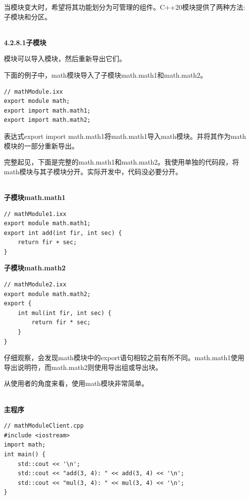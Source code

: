 
当模块变大时，希望将其功能划分为可管理的组件。C++20模块提供了两种方法:子模块和分区。

\hspace*{\fill} \\ %
\noindent
\textbf{4.2.8.1\hspace{0.2cm}子模块}

模块可以导入模块，然后重新导出它们。

下面的例子中，math模块导入了子模块math.math1和math.math2。

\begin{lstlisting}[style=styleCXX]
// mathModule.ixx
export module math;
export import math.math1;
export import math.math2;
\end{lstlisting}

表达式export import math.math1将math.math1导入math模块。并将其作为math模块的一部分重新导出。

完整起见，下面是完整的math.math1和math.math2。我使用单独的代码段，将math模块与其子模块分开。实际开发中，代码没必要分开。

\hspace*{\fill} \\ %
\noindent
\textbf{子模块math.math1}
\begin{lstlisting}[style=styleCXX]
// mathModule1.ixx
export module math.math1;
export int add(int fir, int sec) {
	return fir + sec;
}
\end{lstlisting}

\noindent
\textbf{子模块math.math2}
\begin{lstlisting}[style=styleCXX]
// mathModule2.ixx
export module math.math2;
export {
	int mul(int fir, int sec) {
		return fir * sec;
	}
}
\end{lstlisting}

仔细观察，会发现math模块中的export语句相较之前有所不同。math.math1使用导出说明符，而math.math2则使用导出组或导出块。

从使用者的角度来看，使用math模块非常简单。

\hspace*{\fill} \\ %
\noindent
\textbf{主程序}
\begin{lstlisting}[style=styleCXX]
// mathModuleClient.cpp
#include <iostream>
import math;
int main() {
	std::cout << '\n';
	std::cout << "add(3, 4): " << add(3, 4) << '\n';
	std::cout << "mul(3, 4): " << mul(3, 4) << '\n';
}
\end{lstlisting}

